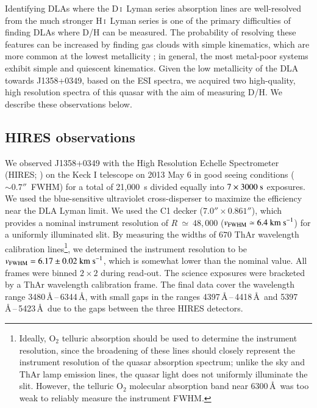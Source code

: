 \documentclass[12pt,preprint,useAMS,usenatbib]{emulateapj}
\newcommand{\DI}{\textrm{D}\,\textsc{i}}
\newcommand{\HI}{\textrm{H}\,\textsc{i}}
\begin{document}
Identifying DLAs where the \DI\ Lyman series absorption lines
are well-resolved from the much stronger \HI\ Lyman series is one
of the primary difficulties of finding DLAs where D/H can be measured.
The probability of resolving these features can be increased by finding
gas clouds with simple kinematics, which are more common at the lowest
metallicity \citep{Led06,Mur07,Pro08,Nel13,JorMurTho13,CooPetJor15};
in general, the most metal-poor systems exhibit simple and quiescent kinematics.
Given the low metallicity of the DLA towards J1358+0349, based on the ESI
spectra, we acquired two high-quality, high resolution spectra of this quasar
with the aim of measuring D/H. We describe these observations below.

\subsection{HIRES observations}

We observed J1358+0349 with the High Resolution Echelle Spectrometer
(HIRES; \citealt{Vog94}) on the Keck I telescope on 2013 May 6 in good
seeing conditions ($\sim0.7''$~FWHM) for a total of 21,000~s divided
equally into $7\times3000~{\rm s}$ exposures. We used the blue-sensitive
ultraviolet cross-disperser to maximize the efficiency near the DLA Lyman
limit. We used the C1 decker ($7.0''\times0.861''$), which provides a
nominal instrument resolution of $R~\simeq~48,000$
($v_{\rm FWHM}\simeq6.4~{\rm km~s}^{-1}$) for a uniformly illuminated slit.
By measuring the widths of $670$ ThAr wavelength calibration lines\footnote{Ideally, O$_{2}$
telluric absorption should be used to determine the instrument resolution,
since the broadening of these lines should closely represent the instrument
resolution of the quasar absorption spectrum; unlike the sky and ThAr lamp
emission lines, the quasar light does not uniformly illuminate the slit. However,
the telluric O$_{2}$ molecular absorption band near 6300\,\AA\ was too
weak to reliably measure the instrument FWHM.},
we determined the instrument resolution to be
$v_{\rm FWHM}=6.17\pm0.02~{\rm km~s}^{-1}$,
which is somewhat lower than the nominal value.
All frames were binned $2\times2$
during read-out. The science exposures were bracketed by a ThAr
wavelength calibration frame.
The final data cover the wavelength range 3480\,\AA\,--\,6344\,\AA,
with small gaps in the ranges 4397\,\AA\,--\,4418\,\AA\ and 5397\,\AA\,--\,5423\,\AA\
due to the gaps between the three HIRES detectors.

\end{document}
